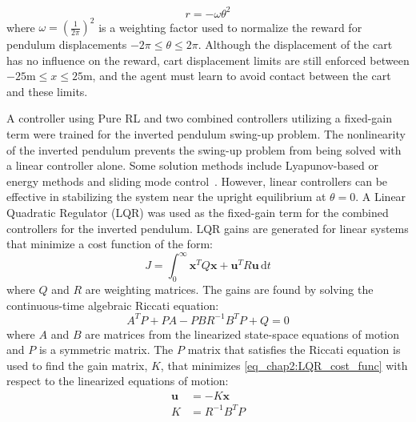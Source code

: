 %
\begin{equation}
r=-\omega\theta^2
\end{equation}
%
where $\omega=\left(\frac{1}{2\pi}\right)^2$ is a weighting factor used to normalize the reward for pendulum displacements $-2\pi\leq\theta\leq2\pi$. 
%
Although the displacement of the cart
has no influence on the reward, cart displacement limits are still enforced between $-25\si{\meter}\leq x \leq 25\si{\meter}$,
and the agent must learn to avoid contact between the cart and these limits.

A controller using Pure RL and two combined controllers utilizing a fixed-gain term were trained for the inverted pendulum swing-up problem. The nonlinearity of the inverted pendulum prevents the swing-up problem from being solved with a linear controller alone. Some solution methods include Lyapunov-based or energy methods and sliding mode control~\cite{Astrom:2000a,Park:2009a,Riachy:2008a,Ibanez:2005a,Muskinja:2006a}. However, linear controllers can be effective in stabilizing the system near the upright equilibrium at $\theta=0$. A Linear Quadratic Regulator (LQR) was used as the fixed-gain term for the combined controllers for the inverted pendulum.
LQR gains are generated for linear systems that minimize a cost function of the form:
%
\begin{equation}
J=\int_0^\infty \boldsymbol{x}^TQ\boldsymbol{x} + \boldsymbol{u}^TR\boldsymbol{u} \, \text{d}t
\label{eq_chap2:LQR_cost_func}
\end{equation}
%
where $Q$ and $R$ are weighting matrices. The gains are found by solving the continuous-time algebraic Riccati equation:
%
\begin{equation}
A^TP+PA-PBR^{-1}B^TP+Q=0
\end{equation}
%
where $A$ and $B$ are matrices from the linearized state-space equations of motion and $P$ is a symmetric matrix. The $P$ matrix that satisfies the Riccati equation is used to find the gain matrix, $K$, that minimizes \eqref{eq_chap2:LQR_cost_func} with respect to the linearized equations of motion:
%
\begin{align*}
\boldsymbol{u} &= -K\boldsymbol{x}\\
K &= R^{-1}B^TP
\end{align*}
